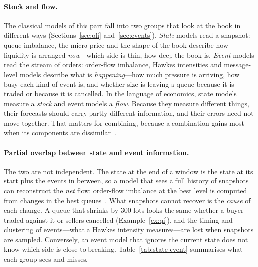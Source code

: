 \paragraph{Stock and flow.} The classical models of this part fall into two groups that look at the book in
different ways (Sections~\ref{sec:ofi} and~\ref{sec:events}). \emph{State} models read a snapshot: queue
imbalance, the micro-price and the shape of the book describe how liquidity is arranged \emph{now}---which
side is thin, how deep the book is. \emph{Event} models read the stream of orders: order-flow imbalance, Hawkes
intensities and message-level models describe what is \emph{happening}---how much pressure is arriving, how
busy each kind of event is, and whether size is leaving a queue because it is traded or because it is
cancelled. In the language of economics, state models measure a \emph{stock} and event models a
\emph{flow}. Because they measure different things, their forecasts should carry partly different
information, and their errors need not move together. That matters for combining, because a combination
gains most when its components are dissimilar~\citep{breiman1996stack}.

\paragraph{Partial overlap between state and event information.} The two are not independent. The state at the end of a window is
the state at its start plus the events in between, so a model that sees a full history of snapshots can
reconstruct the \emph{net} flow: order-flow imbalance at the best level is computed from changes in the
best queues~\citep{cks2014}. What snapshots cannot recover is the \emph{cause} of each change. A queue that
shrinks by 300 lots looks the same whether a buyer traded against it or sellers cancelled
(Example~\ref{ex:qi}), and the timing and clustering of events---what a Hawkes intensity measures---are lost
when snapshots are sampled. Conversely, an event model that ignores the current state does not know which
side is close to breaking. Table~\ref{tab:state-event} summarises what each group sees and misses.

